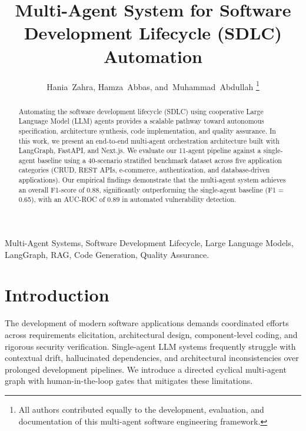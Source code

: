 \documentclass[10pt,journal,compsoc]{IEEEtran}
\title{Multi-Agent System for Software Development Lifecycle (SDLC) Automation}
\author{Hania~Zahra,
        Hamza~Abbas,
        and~Muhammad~Abdullah%
\thanks{All authors contributed equally to the development, evaluation, and documentation of this multi-agent software engineering framework.}
}
\begin{document}
\maketitle

\begin{abstract}
Automating the software development lifecycle (SDLC) using cooperative Large Language Model (LLM) agents provides a scalable pathway toward autonomous specification, architecture synthesis, code implementation, and quality assurance. In this work, we present an end-to-end multi-agent orchestration architecture built with LangGraph, FastAPI, and Next.js. We evaluate our 11-agent pipeline against a single-agent baseline using a 40-scenario stratified benchmark dataset across five application categories (CRUD, REST APIs, e-commerce, authentication, and database-driven applications). Our empirical findings demonstrate that the multi-agent system achieves an overall F1-score of 0.88, significantly outperforming the single-agent baseline (F1 = 0.65), with an AUC-ROC of 0.89 in automated vulnerability detection.
\end{abstract}

\begin{IEEEkeywords}
Multi-Agent Systems, Software Development Lifecycle, Large Language Models, LangGraph, RAG, Code Generation, Quality Assurance.
\end{IEEEkeywords}

\section{Introduction}
The development of modern software applications demands coordinated efforts across requirements elicitation, architectural design, component-level coding, and rigorous security verification. Single-agent LLM systems frequently struggle with contextual drift, hallucinated dependencies, and architectural inconsistencies over prolonged development pipelines. We introduce a directed cyclical multi-agent graph with human-in-the-loop gates that mitigates these limitations.











\end{document}

